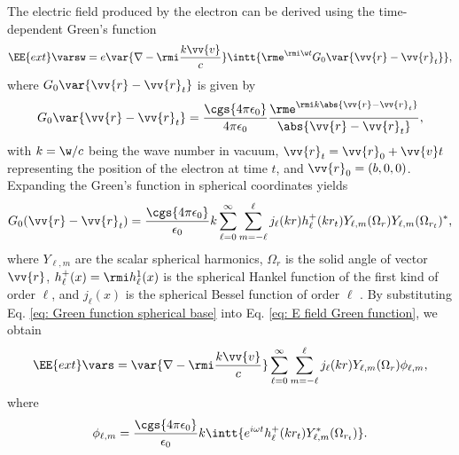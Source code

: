 The electric field produced by the electron can be derived using the time-dependent Green's function \cite{maciel2019electromagnetic} 
\begin{equation}
\EE{ext}\varsw = e\var{\nabla-\rmi \frac{k\vv{v}}{c}} \intt{\rme^{\rmi \w t} G_0 \var{\vv{r}-\vv{r}_t}},
\label{eq: E field Green function}
\end{equation}
where $G_0 \var{\vv{r}-\vv{r}_t}$ is given by 
\begin{equation}
G_0 \var{\vv{r}-\vv{r}_t} = \frac{\cgs{4\pi\epsilon_0}}{4\pi\epsilon_0}\frac{\rme^{\rmi k \abs{\vv{r}-\vv{r}_t}}}{\abs{\vv{r}-\vv{r}_t}},
\end{equation}
with $k = \w/c$ being the wave number in vacuum, $\vv{r}_t=\vv{r}_0+\vv{v}t$ representing the position of the electron at time $t$, and $\vv{r}_0 = (b,0,0)$. Expanding the Green's function in spherical coordinates yields \cite{de1999relativistic}
\begin{equation}
G_0(\vv{r}-\vv{r}_t) = \frac{\cgs{4\pi\epsilon_0}}{\epsilon_0} k \sum_{\ell = 0}^{\infty} \sum_{m=-\ell}^{\ell} j_{\ell}(kr) h_{\ell}^{+}(k r_t) Y_{\ell, m}(\Omega_r) Y_{\ell, m}(\Omega_{r_t})^{*},
\label{eq: Green function spherical base}
\end{equation}
where $Y_{\ell,m}$ are the scalar spherical harmonics, $\Omega_r$ is the solid angle of vector $\vv{r}$, $h_{\ell}^{+}(x) = \rmi h_{\ell}^{1}(x)$ is the spherical Hankel function of the first kind of order $\ell$, and $j_{\ell}(x)$ is the spherical Bessel function of order $\ell$ \citep{Abramowitz}. By substituting Eq. \eqref{eq: Green function spherical base} into Eq. \eqref{eq: E field Green function}, we obtain
\begin{equation}
\EE{ext}\vars = \var{\nabla-\rmi \frac{k\vv{v}}{c}} \sum_{\ell = 0}^{\infty} \sum_{m=-\ell}^{\ell} j_{\ell}(kr) Y_{\ell, m}(\Omega_{r})\phi_{\ell, m},
\end{equation}
where
\begin{equation}
\phi_{\ell, m} = \frac{\cgs{4\pi\epsilon_0}}{\epsilon_0} k \intt{e^{i \omega t} h_{\ell}^{+}(k r_{t}) Y_{\ell, m}^{*}(\Omega_{r_t}) }.
\label{Eq: GdA phi coeffs}
\end{equation}

